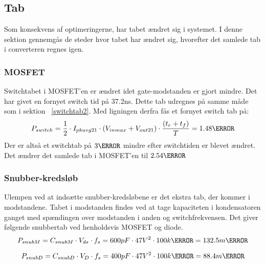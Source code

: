 \subsection{Tab}
Som konsekvens af optimeringerne, har tabet ændret sig i systemet. I denne sektion gennemgås de steder hvor tabet har ændret sig, hvorefter det samlede tab i converteren regnes igen.

\subsubsection{MOSFET}
\noindent Switchtabet i MOSFET'en er ændret idet gate-modstanden er gjort mindre. Det har givet en fornyet switch tid på 37.2ns. Dette tab udregnes på samme måde som i sektion ~\ref{switchtab2}. Med ligningen derfra fås et fornyet switch tab på:
\begin{equation}
P_{switch} = \frac{1}{2} \cdot I_{pkavg21} \cdot (V_{inmax}+V_{out21}) \cdot \frac{(t_r+t_f)}{T}= 1.48\watt
\end{equation} 
Der er altså et switchtab på $3\watt$ mindre efter switchtiden er blevet ændret. Det ændrer det samlede tab i MOSFET'en til $2.54\watt$

\subsubsection{Snubber-kredsløb}
\noindent Ulempen ved at indsætte snubber-kredsløbene er det ekstra tab, der kommer i modstandene. Tabet i modstanden findes ved at tage kapaciteten i kondensatoren ganget med spændingen over modstanden i anden og switchfrekvensen\cite{snubber_power}.
Det giver følgende snubbertab ved henholdsvis MOSFET og diode.
\begin{equation}
P_{snubM} = C_{snubM}\cdot V_{ds} \cdot f_s = 600pF \cdot {47V}^2 \cdot 100k\hertz = 132.5m\watt
\end{equation} 

\begin{equation}
P_{snubD} = C_{snubD}\cdot V_{D} \cdot f_s = 400pF \cdot {47V}^2 \cdot 100k\hertz = 88.4m\watt
\end{equation} 

